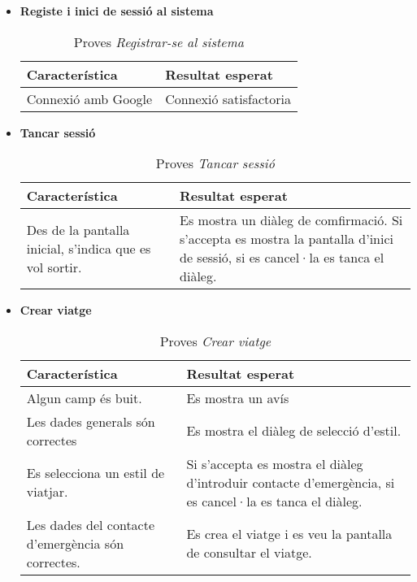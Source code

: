 \begin{itemize}

\item{}\textbf{Registe i inici de sessió al sistema}

\begin{table}[!h]
\centering
\begin{tabular}{|T|T|}
\hline
\textbf{Característica}  & \textbf{Resultat esperat} \\\hline
Connexió amb Google & Connexió satisfactoria\\\hline
\end{tabular}
\label{}
\caption{Proves \textit{Registrar-se al sistema}}
\end{table}


\item{}\textbf{Tancar sessió}

\begin{table}[!h]
\centering
\begin{tabular}{|T|T|}
\hline
\textbf{Característica}  & \textbf{Resultat esperat} \\\hline
Des de la pantalla inicial, s'indica que es vol sortir. & Es mostra un diàleg de comfirmació. Si s'accepta es mostra la pantalla d'inici de sessió, si es cancel·la es tanca el diàleg.\\\hline
\end{tabular}
\label{}
\caption{Proves \textit{Tancar sessió}}
\end{table}

\item{}\textbf{Crear viatge}

\begin{table}[!h]
\centering
\begin{tabular}{|T|T|}
\hline
\textbf{Característica}  & \textbf{Resultat esperat} \\\hline
Algun camp és buit. & Es mostra un avís\\\hline
Les dades generals són correctes & Es mostra el diàleg de selecció d'estil.\\\hline
Es selecciona un estil de viatjar. & Si s'accepta es mostra el diàleg d'introduir contacte d'emergència, si es cancel·la es tanca el diàleg.\\\hline
Les dades del contacte d'emergència són correctes. & Es crea el viatge i es veu la pantalla de consultar el viatge.\\\hline
\end{tabular}
\label{}
\caption{Proves \textit{Crear viatge}}
\end{table}


\end{itemize}
